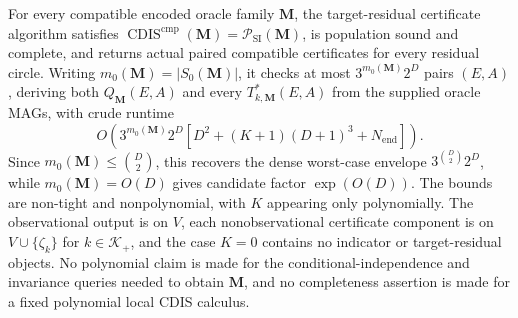For every compatible encoded oracle family \(\mathbf M\), the target-residual certificate algorithm satisfies \(\operatorname{CDIS}^{\mathrm{cmp}}(\mathbf M)=\mathcal P_{\mathrm{SI}}(\mathbf M)\), is population sound and complete, and returns actual paired compatible certificates for every residual circle.  Writing \(m_0(\mathbf M)=|S_0(\mathbf M)|\), it checks at most \(3^{m_0(\mathbf M)}2^D\) pairs \((E,A)\), deriving both \(Q_{\mathbf M}(E,A)\) and every \(T^*_{k,\mathbf M}(E,A)\) from the supplied oracle MAGs, with crude runtime
\[
O\!\left(3^{m_0(\mathbf M)}2^D
\left[D^2+(K+1)(D+1)^3+N_{\mathrm{end}}\right]\right).
\]
Since \(m_0(\mathbf M)\le\binom D2\), this recovers the dense worst-case envelope \(3^{\binom D2}2^D\), while \(m_0(\mathbf M)=O(D)\) gives candidate factor \(\exp(O(D))\).  The bounds are non-tight and nonpolynomial, with \(K\) appearing only polynomially.  The observational output is on \(V\), each nonobservational certificate component is on \(V\cup\{\zeta_k\}\) for \(k\in\mathcal K_+\), and the case \(K=0\) contains no indicator or target-residual objects.  No polynomial claim is made for the conditional-independence and invariance queries needed to obtain \(\mathbf M\), and no completeness assertion is made for a fixed polynomial local CDIS calculus.